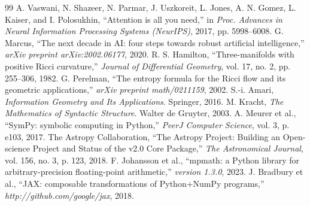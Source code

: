 \documentclass[10pt,journal,compsoc]{IEEEtran}
\begin{document}
\begin{thebibliography}{99}
 A. Vaswani, N. Shazeer, N. Parmar, J. Uszkoreit, L. Jones, A. N. Gomez, L. Kaiser, and I. Polosukhin, ``Attention is all you need,'' in \textit{Proc. Advances in Neural Information Processing Systems (NeurIPS)}, 2017, pp. 5998--6008.
 G. Marcus, ``The next decade in AI: four steps towards robust artificial intelligence,'' \textit{arXiv preprint arXiv:2002.06177}, 2020.
 R. S. Hamilton, ``Three-manifolds with positive Ricci curvature,'' \textit{Journal of Differential Geometry}, vol. 17, no. 2, pp. 255--306, 1982.
 G. Perelman, ``The entropy formula for the Ricci flow and its geometric applications,'' \textit{arXiv preprint math/0211159}, 2002.
 S.-i. Amari, \textit{Information Geometry and Its Applications}. Springer, 2016.
 M. Kracht, \textit{The Mathematics of Syntactic Structure}. Walter de Gruyter, 2003.
 A. Meurer et al., ``SymPy: symbolic computing in Python,'' \textit{PeerJ Computer Science}, vol. 3, p. e103, 2017.
 The Astropy Collaboration, ``The Astropy Project: Building an Open-science Project and Status of the v2.0 Core Package,'' \textit{The Astronomical Journal}, vol. 156, no. 3, p. 123, 2018.
 F. Johansson et al., ``mpmath: a Python library for arbitrary-precision floating-point arithmetic,'' \textit{version 1.3.0}, 2023.
 J. Bradbury et al., ``JAX: composable transformations of Python+NumPy programs,'' \textit{http://github.com/google/jax}, 2018.
\end{thebibliography}
\end{document}
